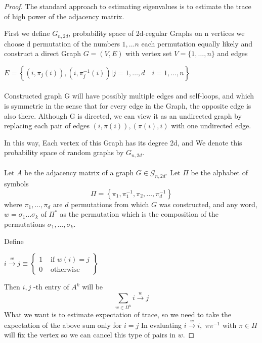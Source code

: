 \documentclass[oneside]{book}
\begin{document}
	\begin{proof}
		The standard approach to estimating eigenvalues is to estimate the trace of high power of the adjacency matrix.\par
		First we define ${G}_{n, 2d}$, probability space of 2d-regular Graphs on n vertices    we choose d permutation of the numbers ${1,\ldots n}$ each permutation equally likely and construct a direct Graph $G = (V,E) $ with  vertex set $V=\{1, \ldots, n\}$ and edges\par
		$E=\left\{\left(i, \pi_{j}(i)\right),\left(i, \pi_{j}^{-1}(i)\right) | j=1, \ldots, d \quad i=1, \ldots, n\right\}$ \\\\
		Constructed graph G will have possibly multiple edges and self-loops, and which is symmetric in the sense that for every edge in the Graph, the opposite edge is also there. Although G is directed, we can view it as an undirected graph by
		replacing each pair of edges $(i, \pi(i)), (\pi(i), i) $ with one undirected edge.\par In this way, Each vertex of this Graph has its degree 2d, and  We denote
		this probability space of random graphs by $G_{n,2d}$. \\\\
		Let $A$ be the adjacency matrix of a graph $G \in \mathscr{G}_{n, 2 d}$. Let $\Pi$ be the alphabet of symbols
		$$
		\Pi=\left\{\pi_{1}, \pi_{1}^{-1}, \pi_{2}, \ldots, \pi_{d}^{-1}\right\}
		$$
		where  $\pi_{1}, \ldots, \pi_{d}$ are  $d$ permutations from which $G$ was constructed, and any word, $w=\sigma_{1} \ldots \sigma_{k}$ of $\Pi^{*}$ as the permutation which is the composition of the permutations $\sigma_{1}, \ldots, \sigma_{k} .$ \par
		Define  \begin{center}
			$i \stackrel{w}{\rightarrow} j \equiv\left\{\begin{array}{ll}
			1 & \text { if  }  w(i)=j \\
			0 & \text { otherwise }
			\end{array}\right\}$ 
		\end{center}
		Then  $i, j$ -th entry of $A^{k}$ will be 
		$$
		\sum_{w \in \Pi^{k}} i \stackrel{w}{\rightarrow} j
		$$
		What we want is  to estimate expectation of  trace, so we need to take the expectation of the above sum only for  $i = j$      
		In evaluating $i \stackrel{w}{\rightarrow} i,$  $\pi \pi^{-1}$ with $\pi \in \Pi $    will fix the vertex so we can cancel this type of pairs in  $w$.\par

\end{proof}
\end{document}

